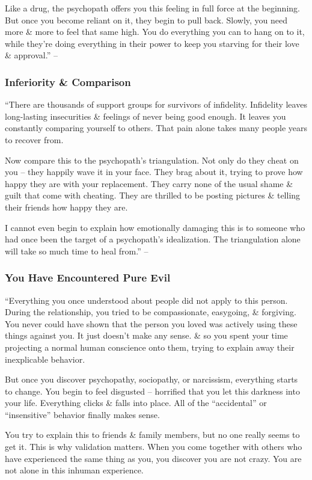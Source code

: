 \documentclass{article}
\numberwithin{equation}{section}
\begin{document}
Like a drug, the psychopath offers you this feeling in full force at the beginning. But once you become reliant on it, they begin to pull back. Slowly, you need more \& more to feel that same high. You do everything you can to hang on to it, while they're doing everything in their power to keep you starving for their love \& approval.'' -- \cite[p. 89]{MacKenzie2015}

\subsubsection{Inferiority \& Comparison}
``There are thousands of support groups for survivors of infidelity. Infidelity leaves long-lasting insecurities \& feelings of never being good enough. It leaves you constantly comparing yourself to others. That pain alone takes many people years to recover from.

Now compare this to the psychopath's triangulation. Not only do they cheat on you -- they happily wave it in your face. They brag about it, trying to prove how happy they are with your replacement. They carry none of the usual shame \& guilt that come with cheating. They are thrilled to be posting pictures \& telling their friends how happy they are.

I cannot even begin to explain how emotionally damaging this is to someone who had once been the target of a psychopath's idealization. The triangulation alone will take so much time to heal from.'' -- \cite[p. 89]{MacKenzie2015}

\subsubsection{You Have Encountered Pure Evil}
``Everything you once understood about people did not apply to this person. During the relationship, you tried to be compassionate, easygoing, \& forgiving. You never could have shown that the person you loved was actively using these things against you. It just doesn't make any sense. \& so you spent your time projecting a normal human conscience onto them, trying to explain away their inexplicable behavior.

But once you discover psychopathy, sociopathy, or narcissism, everything starts to change. You begin to feel disgusted -- horrified that you let this darkness into your life. Everything clicks \& falls into place. All of the ``accidental'' or ``insensitive'' behavior finally makes sense.

You try to explain this to friends \& family members, but no one really seems to get it. This is why validation matters. When you come together with others who have experienced the same thing as you, you discover you are not crazy. You are not alone in this inhuman experience.
\end{document}
